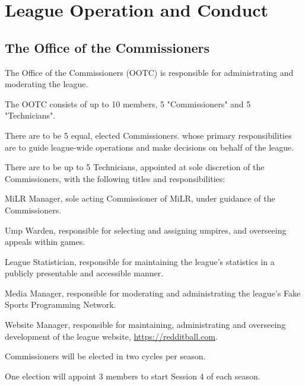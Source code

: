 
\section{League Operation and Conduct}

\subsection{The Office of the Commissioners}
\begin{deepEnumerate}
	\item The Office of the Commissioners (OOTC) is responsible for administrating and moderating the league.
	\item The OOTC consists of up to 10 members, 5 "Commissioners" and 5 "Technicians".
	\begin{deepEnumerate}
		\item There are to be 5 equal, elected Commissioners.
		whose primary responsibilities are to guide league-wide operations 
		and make decisions on behalf of the league.
		\item There are to be up to 5 Technicians, 
		appointed at sole discretion of the Commissioners, 
		with the following titles and responsibilities:
		\begin{deepEnumerate}
			\item MiLR Manager, 
			sole acting Commissioner of MiLR, 
			under guidance of the Commissioners.
			\item Ump Warden, 
			responsible for selecting and assigning umpires, 
			and overseeing appeals within games.
			\item League Statistician, 
			responsible for maintaining the league's statistics 
			in a publicly presentable and accessible manner.
			\item Media Manager, 
			responsible for moderating and administrating 
			the league's Fake Sports Programming Network.
			\item Website Manager, 
			responsible for maintaining, administrating and overseeing development 
			of the league website, \url{https://redditball.com}.
		\end{deepEnumerate}
	\end{deepEnumerate}
	\item Commissioners will be elected in two cycles per season.
	\begin{deepEnumerate}
		\item One election will appoint 3 members to start Session 4 of each season.

\end{deepEnumerate}
\end{deepEnumerate}
